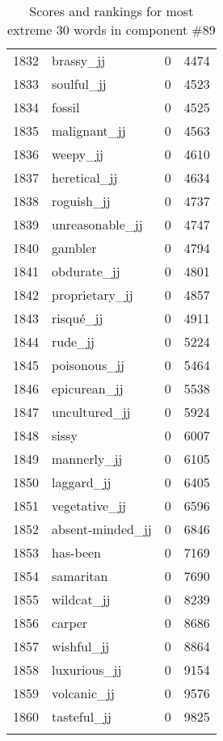 \begin{longtable}[!htbp]{| rlr@{.}l |}
    1832 & brassy\_jj & 0 & 4474 \\
    1833 & soulful\_jj & 0 & 4523 \\
    1834 & fossil & 0 & 4525 \\
    1835 & malignant\_jj & 0 & 4563 \\
    1836 & weepy\_jj & 0 & 4610 \\
    1837 & heretical\_jj & 0 & 4634 \\
    1838 & roguish\_jj & 0 & 4737 \\
    1839 & unreasonable\_jj & 0 & 4747 \\
    1840 & gambler & 0 & 4794 \\
    1841 & obdurate\_jj & 0 & 4801 \\
    1842 & proprietary\_jj & 0 & 4857 \\
    1843 & risqué\_jj & 0 & 4911 \\
    1844 & rude\_jj & 0 & 5224 \\
    1845 & poisonous\_jj & 0 & 5464 \\
    1846 & epicurean\_jj & 0 & 5538 \\
    1847 & uncultured\_jj & 0 & 5924 \\
    1848 & sissy & 0 & 6007 \\
    1849 & mannerly\_jj & 0 & 6105 \\
    1850 & laggard\_jj & 0 & 6405 \\
    1851 & vegetative\_jj & 0 & 6596 \\
    1852 & absent-minded\_jj & 0 & 6846 \\
    1853 & has-been & 0 & 7169 \\
    1854 & samaritan & 0 & 7690 \\
    1855 & wildcat\_jj & 0 & 8239 \\
    1856 & carper & 0 & 8686 \\
    1857 & wishful\_jj & 0 & 8864 \\
    1858 & luxurious\_jj & 0 & 9154 \\
    1859 & volcanic\_jj & 0 & 9576 \\
    1860 & tasteful\_jj & 0 & 9825 \\
    \hline
    \caption{Scores and rankings for most extreme 30 words in component \#89} \\
\end{longtable}
